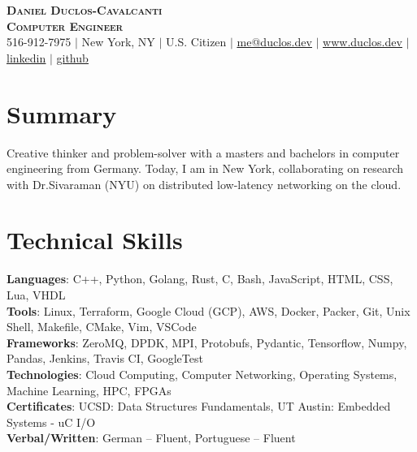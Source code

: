 \documentclass[letterpaper,11pt]{article}
\begin{document}
\begin{flushright}
\end{flushright}

\vspace{-5.0pt}

\begin{center}
    \textbf{\Huge \scshape Daniel Duclos-Cavalcanti} \\ \vspace{1pt}
    \textbf{\large{\scshape Computer Engineer}} \\ \vspace{1pt}
    \small 516-912-7975 $|$ New York, NY $|$ U.S. Citizen $|$
    \href{mailto:me@duclos.dev}{\underline{me@duclos.dev}} $|$ 
    \href{https://www.duclos.dev}{\underline{www.duclos.dev}} $|$
    \href{https://www.linkedin.com/in/duclos-cavalcanti/}{\underline{linkedin}} $|$
    \href{https://github.com/duclos-cavalcanti}{\underline{github}} 
\end{center}

\vspace{-8.0pt}

\section{Summary}
\small{
Creative thinker and problem-solver with a masters and bachelors in 
computer engineering from Germany. Today, I am in New York, 
collaborating on research with Dr.Sivaraman (NYU) on distributed 
low-latency networking on the cloud.
}

\vspace{-8.0pt}

\section{Technical Skills}
 \begin{itemize}[leftmargin=0.15in, label={}]
    \small{\item{
    \textbf{Languages}{: C++, Python, Golang, Rust, C, Bash, JavaScript, HTML, CSS, Lua, VHDL} \\
    \textbf{Tools}{: Linux, Terraform, Google Cloud (GCP), AWS, Docker, Packer, Git, Unix Shell, Makefile, CMake, Vim, VSCode} \\
    \textbf{Frameworks}{: ZeroMQ, DPDK, MPI, Protobufs, Pydantic, Tensorflow, Numpy, Pandas, Jenkins, Travis CI, GoogleTest} \\
    \textbf{Technologies}{: Cloud Computing, Computer Networking, Operating Systems, Machine Learning, HPC, FPGAs} \\
    \textbf{Certificates}{: UCSD: Data Structures Fundamentals, UT Austin: Embedded Systems - uC I/O} \\
    \textbf{Verbal/Written}{: German -- Fluent, Portuguese -- Fluent}
    }}
 \end{itemize}
\end{document}
